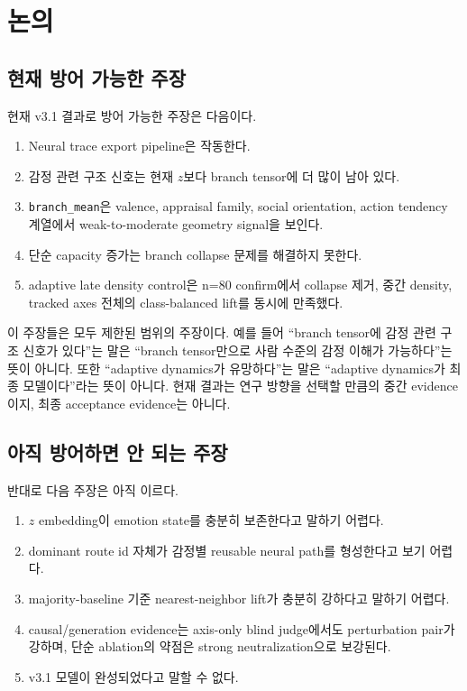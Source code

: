 \documentclass[11pt,a4paper]{article}
\begin{document}
\section{논의}

\subsection{현재 방어 가능한 주장}

현재 v3.1 결과로 방어 가능한 주장은 다음이다.

\begin{enumerate}
  \item Neural trace export pipeline은 작동한다.
  \item 감정 관련 구조 신호는 현재 \(z\)보다 branch tensor에 더 많이 남아 있다.
  \item \texttt{branch\_mean}은 valence, appraisal family, social orientation, action tendency 계열에서 weak-to-moderate geometry signal을 보인다.
  \item 단순 capacity 증가는 branch collapse 문제를 해결하지 못한다.
  \item adaptive late density control은 n=80 confirm에서 collapse 제거, 중간 density, tracked axes 전체의 class-balanced lift를 동시에 만족했다.
\end{enumerate}

이 주장들은 모두 제한된 범위의 주장이다. 예를 들어 ``branch tensor에 감정 관련 구조 신호가 있다''는 말은 ``branch tensor만으로 사람 수준의 감정 이해가 가능하다''는 뜻이 아니다. 또한 ``adaptive dynamics가 유망하다''는 말은 ``adaptive dynamics가 최종 모델이다''라는 뜻이 아니다. 현재 결과는 연구 방향을 선택할 만큼의 중간 evidence이지, 최종 acceptance evidence는 아니다.

\subsection{아직 방어하면 안 되는 주장}

반대로 다음 주장은 아직 이르다.

\begin{enumerate}
  \item \(z\) embedding이 emotion state를 충분히 보존한다고 말하기 어렵다.
  \item dominant route id 자체가 감정별 reusable neural path를 형성한다고 보기 어렵다.
  \item majority-baseline 기준 nearest-neighbor lift가 충분히 강하다고 말하기 어렵다.
  \item causal/generation evidence는 axis-only blind judge에서도 perturbation pair가 강하며, 단순 ablation의 약점은 strong neutralization으로 보강된다.
  \item v3.1 모델이 완성되었다고 말할 수 없다.
\end{enumerate}
\end{document}
